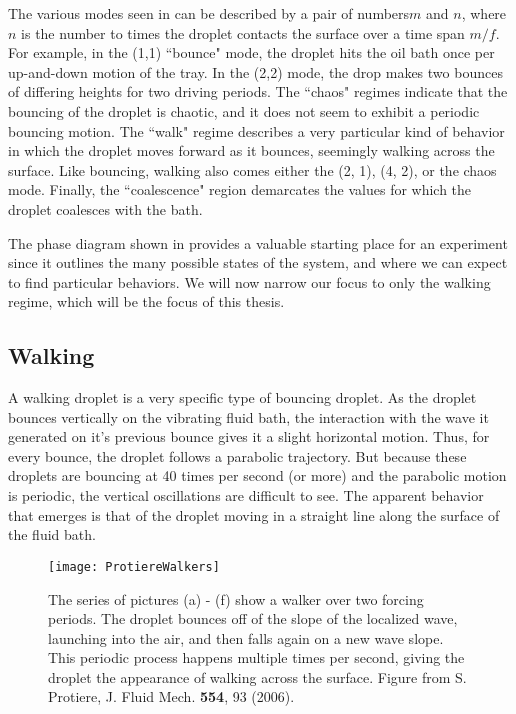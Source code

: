 The various modes seen in  can be described by a pair of numbers$m$ and $n$, where $n$ is the number to times the droplet contacts the surface over a time span $m/f$. For example, in the (1,1) ``bounce" mode, the droplet hits the oil bath once per up-and-down motion of the tray. In the (2,2) mode, the drop makes two bounces of differing heights for two driving periods. The ``chaos" regimes indicate that the bouncing of the droplet is chaotic, and it does not seem to exhibit a periodic bouncing motion. The ``walk" regime describes a very particular kind of behavior in which the droplet moves forward as it bounces, seemingly walking across the surface. Like bouncing, walking also comes either the (2, 1), (4, 2), or the chaos mode. Finally, the ``coalescence" region demarcates the values for which the droplet coalesces with the bath.

The phase diagram shown in  provides a valuable starting place for an experiment since it outlines the many possible states of the system, and where we can expect to find particular behaviors. We will now narrow our focus to only the walking regime, which will be the focus of this thesis.

	        \subsection{Walking}
	        \label{sect:walking}
A walking droplet is a very specific type of bouncing droplet. As the droplet bounces vertically on the vibrating fluid bath, the interaction with the wave it generated on it's previous bounce gives it a slight horizontal motion. Thus, for every bounce, the droplet follows a parabolic trajectory. But because these droplets are bouncing at 40 times per second (or more) and the parabolic motion is periodic, the vertical oscillations are difficult to see. The apparent behavior that emerges is that of the droplet moving in a straight line along the surface of the fluid bath.             

 \begin{figure}[h]
	       \centering
	    \texttt{[image: ProtiereWalkers]}
	     \caption{%
	    The series of pictures (a) - (f) show a walker over two forcing periods. The droplet bounces off of the slope of the localized wave, launching into the air, and then falls again on a new wave slope. This periodic process happens multiple times per second, giving the droplet the appearance of walking across the surface. Figure from S. Protiere, J. Fluid Mech. \textbf{554}, 93 (2006).
	     }
	 \label{Couderwalkers}
	\end{figure}
 
